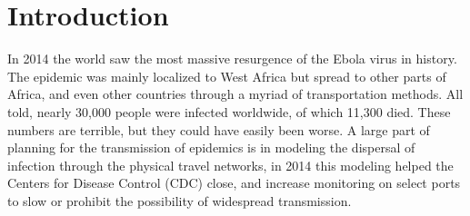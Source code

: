 \section{Introduction}\label{sec:introduction-\myInitials}


In 2014 the world saw the most massive resurgence of the Ebola virus in history. The epidemic was mainly localized to West Africa but spread to other parts of Africa, and even other countries through a myriad of transportation methods. All told, nearly 30,000 people were infected worldwide, of which 11,300 died. These numbers are terrible, but they could have easily been worse. A large part of planning for the transmission of epidemics is in modeling the dispersal of infection through the physical travel networks, in 2014 this modeling helped the Centers for Disease Control (CDC) close, and increase monitoring on select ports to slow or prohibit the possibility of widespread transmission. 
